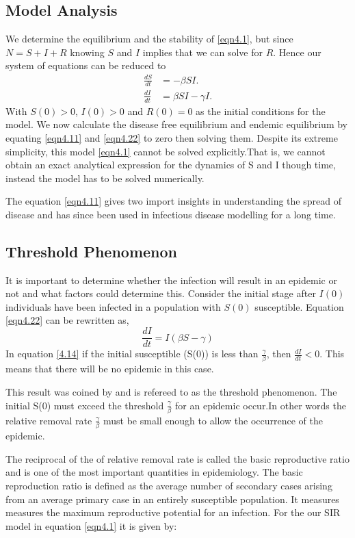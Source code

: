 \subsection{Model Analysis}
We determine the equilibrium and the stability of \ref{eqn4.1}, but since $N =S + I + R$ knowing $S$ and $I$ implies that we can solve for  $R$. Hence our system of equations can be reduced to 
\begin{align}
\frac{dS}{dt} &=-\beta SI. \label{eqn4.11} \\
 \frac{dI}{dt} &= \beta S I - \gamma  I \label{eqn4.22}.
\end{align}
 With $S(0) >0$, $I(0) > 0$ and $R(0) =0$ as the initial conditions for the model.
 We now calculate the disease free equilibrium and endemic equilibrium by equating \ref{eqn4.11} and \ref{eqn4.22} to zero then solving them. Despite its extreme simplicity, this model \ref{eqn4.1} cannot be solved explicitly.That is, we cannot obtain an exact analytical expression for the dynamics of S and I
though time, instead the model has to be solved numerically.

The equation \ref{eqn4.11} gives two import insights in understanding the spread of disease and has since been used in infectious disease modelling for a long time.

\subsection{Threshold Phenomenon} 
It is important to determine whether the infection will result in an epidemic or not and what factors could determine this. Consider the initial stage after $I (0) $ individuals have been infected in a population with $S (0) $ susceptible. Equation \ref{eqn4.22} can be rewritten as,
\begin{equation} 
\frac{dI}{dt} = I \left(\beta S -\gamma \right)\label{4.14}
\end{equation}
In equation \ref{4.14} if the initial susceptible (S(0)) is less than $\frac{\gamma}{\beta}$, then $\frac{dI}{dt} < 0 $. This means that there will be no epidemic in this case.

This result was coined by \cite{m1925applications} and  is refereed to as the threshold phenomenon. The initial S(0) must exceed the threshold $\frac{\gamma}{\beta}$ for an epidemic occur.In  other words the relative removal rate $\frac{\gamma}{\beta}$ must be small enough to allow the occurrence  of the epidemic.
 
 The reciprocal of the of relative removal rate is called the basic reproductive ratio and is one of the most important quantities in epidemiology. The basic reproduction ratio is defined as the average number of secondary cases arising from an average primary case in an entirely susceptible population. It measures measures the maximum reproductive potential for an infection. For the our SIR model in equation \ref{eqn4.1} it is given by:

